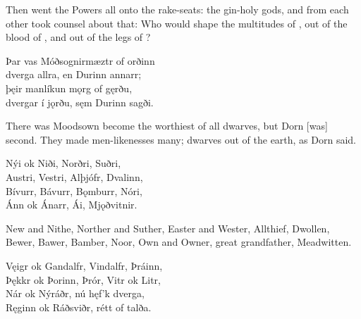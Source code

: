 \bvb Then went the Powers all onto the rake-seats: the gin-holy gods, and from each other took counsel about that: Who would shape the multitudes of , out of the blood of , and out of the legs of ?\footnotemark[1]\evb
{}

\bva Þar vas Móðsognir\footnotemark[1] \hld mæztr of orðinn \\%
dverga allra, \hld en Durinn annarr; \\%
þęir manlíkun \hld mǫrg of gęrðu, \\%
dvergar í jǫrðu, \hld sęm Durinn sagði.\eva
{}

\bvb There was Moodsown become the worthiest of all dwarves, but Dorn [was] second. They made men-likenesses many; dwarves out of the earth, as Dorn said.\footnotemark[1]\evb
{}\evb

\bva Nýi ok Niði, \hld Norðri, Suðri, \\%
Austri, Vestri, \hld Alþjófr, Dvalinn, \\%
Bívurr, Bávurr, \hld Bǫmburr, Nóri, \\%
Ánn ok Ánarr, \hld Ái, Mjǫðvitnir.\footnotemark[1]\eva
{}

\bvb New and Nithe, Norther and Suther, Easter and Wester, Allthief, Dwollen, Bewer, Bawer, Bamber, Noor, Own and Owner, great grandfather, Meadwitten.\evb

\bva Vęigr ok Gandalfr, \hld Vindalfr, Þráinn, \\%
Þękkr ok Þorinn, \hld Þrór, Vitr ok Litr, \\%
Nár ok Nýráðr, \hld nú hęf’k dverga, \\%
Ręginn ok Ráðsviðr, \hld rétt of talða.\eva

